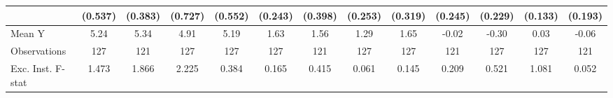 {\begin{tabular}{l*{12}{c}}
            &     (0.537)         &     (0.383)         &     (0.727)         &     (0.552)         &     (0.243)         &     (0.398)         &     (0.253)         &     (0.319)         &     (0.245)         &     (0.229)         &     (0.133)         &     (0.193)         \\
\midrule
Mean Y      &        5.24         &        5.34         &        4.91         &        5.19         &        1.63         &        1.56         &        1.29         &        1.65         &       -0.02         &       -0.30         &        0.03         &       -0.06         \\
Observations&         127         &         121         &         127         &         127         &         127         &         121         &         127         &         127         &         121         &         127         &         127         &         121         \\
Exc. Inst. F-stat&       1.473         &       1.866         &       2.225         &       0.384         &       0.165         &       0.415         &       0.061         &       0.145         &       0.209         &       0.521         &       1.081         &       0.052         \\
\bottomrule
\end{tabular}
}
